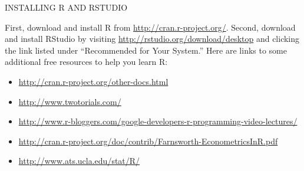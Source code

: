 \documentclass[11pt, letterpaper]{article}
\begin{document}
\newpage

\begin{center}
\small
INSTALLING R AND RSTUDIO
\end{center}

First, download and install R from \url{http://cran.r-project.org/}. Second, download and install RStudio by visiting \url{http://rstudio.org/download/desktop} and clicking the link listed under ``Recommended for Your System.'' 
Here are links to some additional free resources to help you learn R:
\begin{itemize}
		       \item \url{http://cran.r-project.org/other-docs.html}
\item \url{http://www.twotorials.com/}
			\item \url{http://www.r-bloggers.com/google-developers-r-programming-video-lectures/}
		 	\item \url{http://cran.r-project.org/doc/contrib/Farnsworth-EconometricsInR.pdf}
 			\item \url{http://www.ats.ucla.edu/stat/R/}
\end{itemize}
\end{document}
